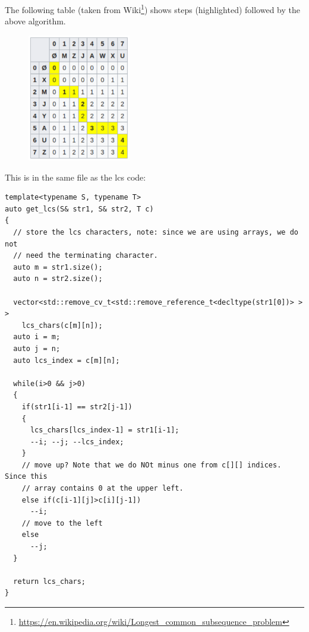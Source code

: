 The following table (taken from
Wiki\footnote{\url{https://en.wikipedia.org/wiki/Longest\_common\_subsequence\_problem}})
shows steps (highlighted) followed by the above algorithm.

\begin{figure}
\centering
\includegraphics[width=0.4\textwidth]{Images/figGFGDPSet4LCSPrint}
\label{figGFGDPSet4LCSPrint}
\end{figure}

\textbf{}

\RayNotesBegin

This is in the same file as the lcs code:\\
\begin{lstlisting}[style=raycppnewsnippet]
template<typename S, typename T>
auto get_lcs(S& str1, S& str2, T c)
{
  // store the lcs characters, note: since we are using arrays, we do not
  // need the terminating character.
  auto m = str1.size();
  auto n = str2.size();

  vector<std::remove_cv_t<std::remove_reference_t<decltype(str1[0])> > > 
    lcs_chars(c[m][n]);
  auto i = m;
  auto j = n;
  auto lcs_index = c[m][n];

  while(i>0 && j>0)
  {
    if(str1[i-1] == str2[j-1])
    {
      lcs_chars[lcs_index-1] = str1[i-1];
      --i; --j; --lcs_index;
    }
    // move up? Note that we do NOt minus one from c[][] indices. Since this
    // array contains 0 at the upper left.
    else if(c[i-1][j]>c[i][j-1])
      --i;
    // move to the left
    else 
      --j;
  }

  return lcs_chars;
}
\end{lstlisting}

\RayNotesEnd

